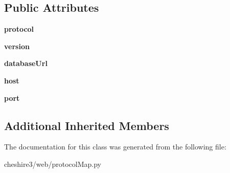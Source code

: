 \subsection*{Public Attributes}
\begin{DoxyCompactItemize}
\item 
\hypertarget{classcheshire3_1_1web_1_1protocol_map_1_1_c3_wep_protocol_map_a7d493984e5e8027f5a1d8d1fa4edaa35}{{\bfseries protocol}}\label{classcheshire3_1_1web_1_1protocol_map_1_1_c3_wep_protocol_map_a7d493984e5e8027f5a1d8d1fa4edaa35}

\item 
\hypertarget{classcheshire3_1_1web_1_1protocol_map_1_1_c3_wep_protocol_map_a37e30b3616f44a5a2c2e97847c8c9a9f}{{\bfseries version}}\label{classcheshire3_1_1web_1_1protocol_map_1_1_c3_wep_protocol_map_a37e30b3616f44a5a2c2e97847c8c9a9f}

\item 
\hypertarget{classcheshire3_1_1web_1_1protocol_map_1_1_c3_wep_protocol_map_adfb7f9c983715d41f5ed1191ccc1ee52}{{\bfseries database\-Url}}\label{classcheshire3_1_1web_1_1protocol_map_1_1_c3_wep_protocol_map_adfb7f9c983715d41f5ed1191ccc1ee52}

\item 
\hypertarget{classcheshire3_1_1web_1_1protocol_map_1_1_c3_wep_protocol_map_ad30e1ae201f66d7eff287f93552a2cf2}{{\bfseries host}}\label{classcheshire3_1_1web_1_1protocol_map_1_1_c3_wep_protocol_map_ad30e1ae201f66d7eff287f93552a2cf2}

\item 
\hypertarget{classcheshire3_1_1web_1_1protocol_map_1_1_c3_wep_protocol_map_afa635b8df180dbd9c16b1b7fe151ac31}{{\bfseries port}}\label{classcheshire3_1_1web_1_1protocol_map_1_1_c3_wep_protocol_map_afa635b8df180dbd9c16b1b7fe151ac31}

\end{DoxyCompactItemize}
\subsection*{Additional Inherited Members}


The documentation for this class was generated from the following file\-:\begin{DoxyCompactItemize}
\item 
cheshire3/web/protocol\-Map.\-py\end{DoxyCompactItemize}
